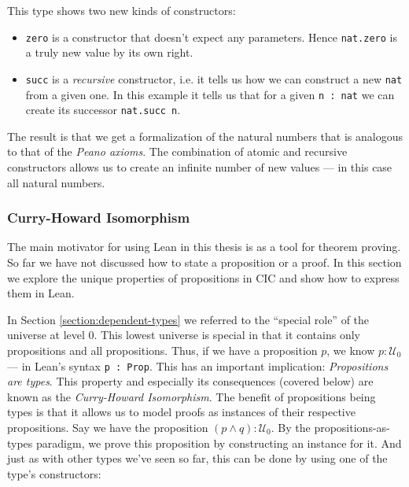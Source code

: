 \noindent This type shows two new kinds of constructors:

\begin{itemize}
  \item \lstinline{zero} is a constructor that doesn't expect any parameters.
  Hence \lstinline{nat.zero} is a truly new value by its own right.
  \item \lstinline{succ} is a \emph{recursive} constructor, i.e. it tells us how we can construct a new \lstinline{nat} from a given one.
  In this example it tells us that for a given \lstinline{n : nat} we can create its successor \lstinline{nat.succ n}.
\end{itemize}

\noindent The result is that we get a formalization of the natural numbers that is analogous to that of the \emph{Peano axioms}.
The combination of atomic and recursive constructors allows us to create an infinite number of new values --- in this case all natural numbers.

\subsubsection{Curry-Howard Isomorphism}
\label{section:howard-curry}

The main motivator for using Lean in this thesis is as a tool for theorem proving.
So far we have not discussed how to state a proposition or a proof.
In this section we explore the unique properties of propositions in CIC and show how to express them in Lean.

\vspace{3mm}

\noindent In Section \ref{section:dependent-types} we referred to the ``special role'' of the universe at level $0$.
This lowest universe is special in that it contains only propositions and all propositions.
Thus, if we have a proposition $p$, we know $p : \mathcal{U}_0$ --- in Lean's syntax \verb|p : Prop|.
This has an important implication: \emph{Propositions are types}.
This property and especially its consequences (covered below) are known as the \emph{Curry-Howard Isomorphism}.
The benefit of propositions being types is that it allows us to model proofs as instances of their respective propositions.
Say we have the proposition $(p \wedge q) : \mathcal{U}_0$. 
By the propositions-as-types paradigm, we prove this proposition by constructing an instance for it.
And just as with other types we've seen so far, this can be done by using one of the type's constructors:

